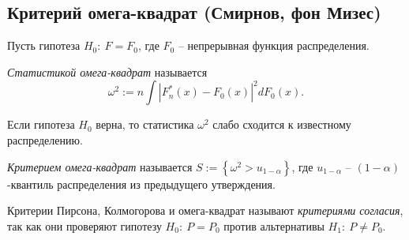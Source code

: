 \subsection{Критерий омега-квадрат (Смирнов, фон Мизес)}

Пусть гипотеза $\displaystyle H_{0} :\ F=F_{0}$, где $\displaystyle F_{0}$ -- непрерывная функция распределения.
\begin{definition}
    \textit{Статистикой омега-квадрат} называется
    \begin{equation*}
        \omega ^{2} :=n\int \left| F_{n}^{*}( x) -F_{0}( x)\right| ^{2} dF_{0}( x) .
    \end{equation*}
\end{definition}
\begin{proposition}
    Если гипотеза $\displaystyle H_{0}$ верна, то статистика $\displaystyle \omega ^{2}$ слабо сходится к известному распределению.
\end{proposition}
\begin{definition}
    \textit{Критерием омега-квадрат} называется $\displaystyle S:=\left\{\omega ^{2}  >u_{1-\alpha }\right\}$, где $\displaystyle u_{1-\alpha }$ -- $\displaystyle ( 1-\alpha )$-квантиль распределения из предыдущего утверждения.
\end{definition}
\begin{definition}
    Критерии Пирсона, Колмогорова и омега-квадрат называют \textit{критериями согласия}, так как они проверяют гипотезу $\displaystyle H_{0} :\ P=P_{0}$ против альтернативы $\displaystyle H_{1} :\ P\neq P_{0}$.
\end{definition}